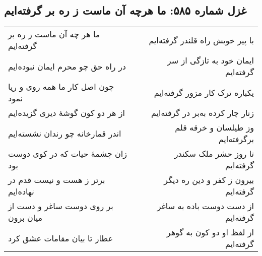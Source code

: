 \begin{center}
\section*{غزل شماره ۵۸۵: ما هرچه آن ماست ز ره بر گرفته‌ایم}
\label{sec:585}
\begin{longtable}{l p{0.5cm} r}
ما هر چه آن ماست ز ره بر گرفته‌ایم
&&
با پیر خویش راه قلندر گرفته‌ایم
\\
در راه حق چو محرم ایمان نبوده‌ایم
&&
ایمان خود به تازگی از سر گرفته‌ایم
\\
چون اصل کار ما همه روی و ریا نمود
&&
یکباره ترک کار مزور گرفته‌ایم
\\
از هر دو کون گوشهٔ دیری گزیده‌ایم
&&
زنار چار کرده به‌بر در گرفته‌ایم
\\
اندر قمارخانه چو رندان نشسته‌ایم
&&
وز طیلسان و خرقه قلم برگرفته‌ایم
\\
زان چشمهٔ حیات که در کوی دوست بود
&&
تا روز حشر ملک سکندر گرفته‌ایم
\\
برتر ز هست و نیست قدم در نهاده‌ایم
&&
بیرون ز کفر و دین ره دیگر گرفته‌ایم
\\
بر روی دوست ساغر و دست از میان برون
&&
از دست دوست باده به ساغر گرفته‌ایم
\\
عطار تا بیان مقامات عشق کرد
&&
از لفظ او دو کون به گوهر گرفته‌ایم
\\
\end{longtable}
\end{center}

